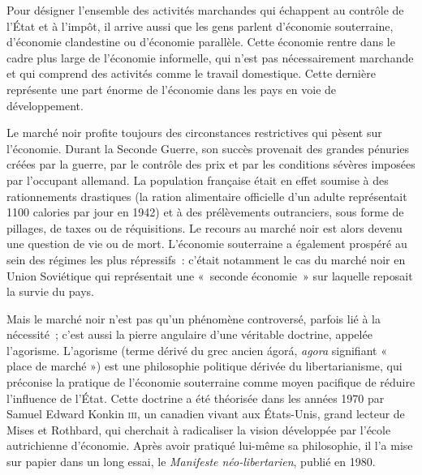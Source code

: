 Pour désigner l'ensemble des activités marchandes qui échappent au contrôle de l'État et à l'impôt, il arrive aussi que les gens parlent d'économie souterraine, d'économie clandestine ou d'économie parallèle. Cette économie rentre dans le cadre plus large de l'économie informelle, qui n'est pas nécessairement marchande et qui comprend des activités comme le travail domestique. Cette dernière représente une part énorme de l'économie dans les pays en voie de développement.

Le marché noir profite toujours des circonstances restrictives qui pèsent sur l'économie. Durant la Seconde Guerre, son succès provenait des grandes pénuries créées par la guerre, par le contrôle des prix et par les conditions sévères imposées par l'occupant allemand. La population française était en effet soumise à des rationnements drastiques (la ration alimentaire officielle d'un adulte représentait 1100 calories par jour en 1942) et à des prélèvements outranciers, sous forme de pillages, de taxes ou de réquisitions. Le recours au marché noir est alors devenu une question de vie ou de mort. L'économie souterraine a également prospéré au sein des régimes les plus répressifs~: c'était notamment le cas du marché noir en Union Soviétique qui représentait une «~seconde économie~» sur laquelle reposait la survie du pays.


Mais le marché noir n'est pas qu'un phénomène controversé, parfois lié à la nécessité~; c'est aussi la pierre angulaire d'une véritable doctrine, appelée l'agorisme. L'agorisme (terme dérivé du grec ancien \foreignlanguage{greek}{ágorá}, \emph{agora} signifiant « place de marché ») est une philosophie politique dérivée du libertarianisme, qui préconise la pratique de l'économie souterraine comme moyen pacifique de réduire l'influence de l'État. Cette doctrine a été théorisée dans les années 1970 par Samuel Edward Konkin \textsc{iii}, un canadien vivant aux États-Unis, grand lecteur de Mises et Rothbard, qui cherchait à radicaliser la vision développée par l'école autrichienne d'économie. Après avoir pratiqué lui-même sa philosophie, il l'a mise sur papier dans un long essai, le \emph{Manifeste néo-libertarien}, publié en 1980.

